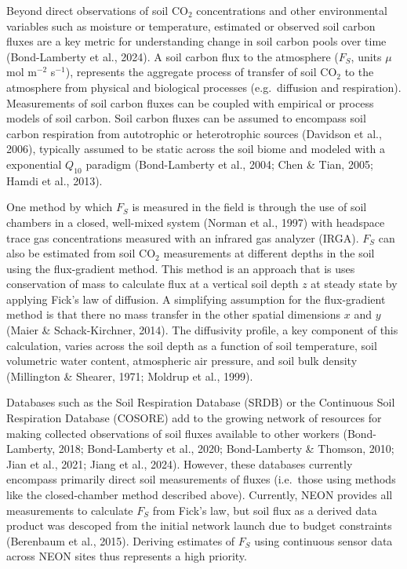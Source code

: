 \documentclass[
  letterpaper,
  DIV=11,
  numbers=noendperiod]{scrartcl}
\begin{document}
Beyond direct observations of soil CO\(_{2}\) concentrations and other
environmental variables such as moisture or temperature, estimated or
observed soil carbon fluxes are a key metric for understanding change in
soil carbon pools over time (Bond-Lamberty et al., 2024). A soil carbon
flux to the atmosphere (\(F_{S}\), units \(\mu\)mol m\(^{-2}\)
s\(^{-1}\)), represents the aggregate process of transfer of soil
CO\(_{2}\) to the atmosphere from physical and biological processes
(e.g.~diffusion and respiration). Measurements of soil carbon fluxes can
be coupled with empirical or process models of soil carbon. Soil carbon
fluxes can be assumed to encompass soil carbon respiration from
autotrophic or heterotrophic sources (Davidson et al., 2006), typically
assumed to be static across the soil biome and modeled with a
exponential \(Q_{10}\) paradigm (Bond-Lamberty et al., 2004; Chen \&
Tian, 2005; Hamdi et al., 2013).

One method by which \(F_{S}\) is measured in the field is through the
use of soil chambers in a closed, well-mixed system (Norman et al.,
1997) with headspace trace gas concentrations measured with an infrared
gas analyzer (IRGA). \(F_{S}\) can also be estimated from soil
CO\(_{2}\) measurements at different depths in the soil using the
flux-gradient method. This method is an approach that is uses
conservation of mass to calculate flux at a vertical soil depth \(z\) at
steady state by applying Fick's law of diffusion. A simplifying
assumption for the flux-gradient method is that there no mass transfer
in the other spatial dimensions \(x\) and \(y\) (Maier \&
Schack-Kirchner, 2014). The diffusivity profile, a key component of this
calculation, varies across the soil depth as a function of soil
temperature, soil volumetric water content, atmospheric air pressure,
and soil bulk density (Millington \& Shearer, 1971; Moldrup et al.,
1999).

Databases such as the Soil Respiration Database (SRDB) or the Continuous
Soil Respiration Database (COSORE) add to the growing network of
resources for making collected observations of soil fluxes available to
other workers (Bond-Lamberty, 2018; Bond-Lamberty et al., 2020;
Bond-Lamberty \& Thomson, 2010; Jian et al., 2021; Jiang et al., 2024).
However, these databases currently encompass primarily direct soil
measurements of fluxes (i.e.~those using methods like the closed-chamber
method described above). Currently, NEON provides all measurements to
calculate \(F_{S}\) from Fick's law, but soil flux as a derived data
product was descoped from the initial network launch due to budget
constraints (Berenbaum et al., 2015). Deriving estimates of \(F_{S}\)
using continuous sensor data across NEON sites thus represents a high
priority.
\end{document}
